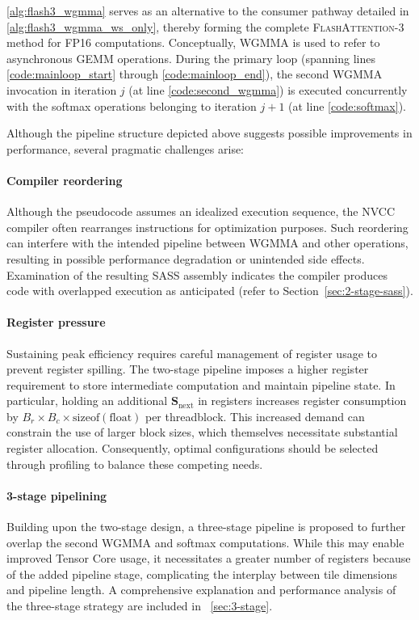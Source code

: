 \cref{alg:flash3_wgmma} serves as an alternative to the consumer pathway detailed in \cref{alg:flash3_wgmma_ws_only}, thereby forming the complete \textsc{FlashAttention-3} method for FP16 computations. Conceptually, WGMMA is used to refer to asynchronous GEMM operations. During the primary loop (spanning lines \ref{code:mainloop_start} through \ref{code:mainloop_end}), the second WGMMA invocation in iteration $j$ (at line \ref{code:second_wgmma}) is executed concurrently with the softmax operations belonging to iteration $j+1$ (at line \ref{code:softmax}).

Although the pipeline structure depicted above suggests possible improvements in performance, several pragmatic challenges arise:

\paragraph{Compiler reordering} Although the pseudocode assumes an idealized execution sequence, the NVCC compiler often rearranges instructions for optimization purposes. Such reordering can interfere with the intended pipeline between WGMMA and other operations, resulting in possible performance degradation or unintended side effects. Examination of the resulting SASS assembly indicates the compiler produces code with overlapped execution as anticipated (refer to Section~\ref{sec:2-stage-sass}).

\paragraph{Register pressure} Sustaining peak efficiency requires careful management of register usage to prevent register spilling. The two-stage pipeline imposes a higher register requirement to store intermediate computation and maintain pipeline state. In particular, holding an additional $\mathbf{S}_{\mathrm{next}}$ in registers increases register consumption by $B_r \times B_c \times \text{sizeof}(\text{float})$ per threadblock. This increased demand can constrain the use of larger block sizes, which themselves necessitate substantial register allocation. Consequently, optimal configurations should be selected through profiling to balance these competing needs.

\paragraph{3-stage pipelining} Building upon the two-stage design, a three-stage pipeline is proposed to further overlap the second WGMMA and softmax computations. While this may enable improved Tensor Core usage, it necessitates a greater number of registers because of the added pipeline stage, complicating the interplay between tile dimensions and pipeline length. A comprehensive explanation and performance analysis of the three-stage strategy are included in ~\cref{sec:3-stage}.

